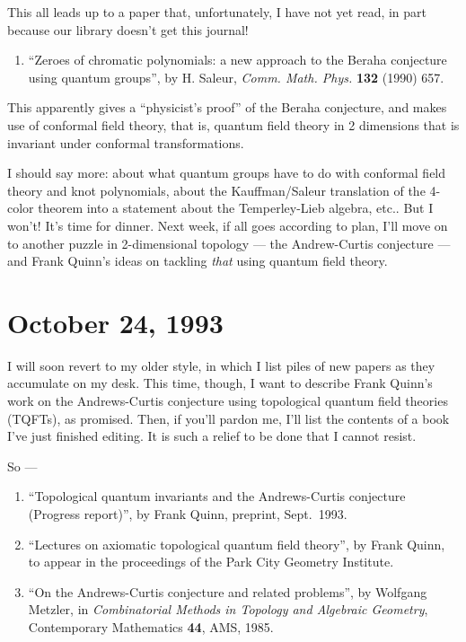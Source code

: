 \documentclass{article}
\def\tightlist{}
\begin{document}
This all leads up to a paper that, unfortunately, I have not yet read,
in part because our library doesn't get this journal!

\begin{enumerate}
\def\labelenumi{\arabic{enumi})}
\setcounter{enumi}{4}
\tightlist
\item
  ``Zeroes of chromatic polynomials: a new approach to the Beraha
  conjecture using quantum groups'', by H. Saleur, \emph{Comm. Math.
  Phys.} \textbf{132} (1990) 657.
\end{enumerate}

This apparently gives a ``physicist's proof'' of the Beraha conjecture,
and makes use of conformal field theory, that is, quantum field theory
in 2 dimensions that is invariant under conformal transformations.

I should say more: about what quantum groups have to do with conformal
field theory and knot polynomials, about the Kauffman/Saleur translation
of the 4-color theorem into a statement about the Temperley-Lieb
algebra, etc.. But I won't! It's time for dinner. Next week, if all goes
according to plan, I'll move on to another puzzle in 2-dimensional
topology --- the Andrew-Curtis conjecture --- and Frank Quinn's ideas on
tackling \emph{that} using quantum field theory.
\hypertarget{week23}{%
\section{October 24, 1993}\label{week23}}

I will soon revert to my older style, in which I list piles of new
papers as they accumulate on my desk. This time, though, I want to
describe Frank Quinn's work on the Andrews-Curtis conjecture using
topological quantum field theories (TQFTs), as promised. Then, if you'll
pardon me, I'll list the contents of a book I've just finished editing.
It is such a relief to be done that I cannot resist.

So ---

\begin{enumerate}
\def\labelenumi{\arabic{enumi})}
\item
  ``Topological quantum invariants and the Andrews-Curtis conjecture
  (Progress report)'', by Frank Quinn, preprint, Sept.~1993.
\item
  ``Lectures on axiomatic topological quantum field theory'', by Frank
  Quinn, to appear in the proceedings of the Park City Geometry
  Institute.
\item
  ``On the Andrews-Curtis conjecture and related problems'', by Wolfgang
  Metzler, in \emph{Combinatorial Methods in Topology and Algebraic
  Geometry}, Contemporary Mathematics \textbf{44}, AMS, 1985.
\end{enumerate}
\end{document}

